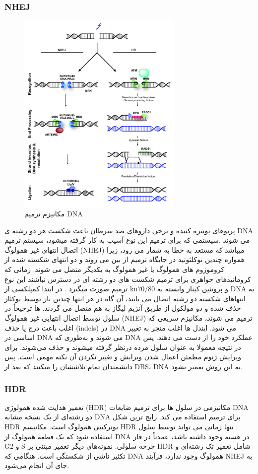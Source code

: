 \documentclass[12pt,a4paper,BCOR=.7cm,headsepline,bibliography=totoc]{report}
\begin{document}
\subsubsection{NHEJ}
\begin{figure}
\centering
\includegraphics[width=8cm, ]{pictures/DBSrepair.jpg}
\caption{
مکانیزم ترمیم DNA
}\label{wrap-fig:4}
\end{figure}
پرتوهای یونیزه کننده و برخی داروهای ضد سرطان باعث شکست هر دو رشته ی DNA می شوند .سیستمی که برای ترمیم این نوع آسیب به کار گرفته میشود، سیستم ترمیم اتصال انتهای غیر همولوگ (NHEJ) میباشد که مستعد به خطا به شمار می رود، زیرا همواره چندین نوکلئوتید در جایگاه ترمیم از بین می روند و دو انتهای شکسته شده از کروموزوم های همولوگ یا غیر همولوگ به یکدیگر متصل می شوند.
زمانی که کروماتیدهای خواهری برای ترمیم شکست های دو رشته ای در دسترس نباشند این نوع ترمیم صورت میگیرد . در ابتدا کمپلکسی از ku70/80 و پروتئین کیناز وابسته به DNA به انتهاهای شکسته دو رشته اتصال می یابند، آن گاه در هر انتها چندین باز توسط نوکئاز حذف شده و دو مولکول از طریق آنزیم لیگاز به هم متصل می گردند. 
ها
 ترجیحاً در سلول توسط اتصال انتهایی غیر همولوگ (NHEJ) ترمیم می شوند، مکانیزم سریعی که اغلب باعث درج یا حذف (indels) در DNA می شود. ایندل ها اغلب منجر به تغییر اساسی در DNA می شوند و به‌طوری که DNA عملکرد خود را از دست می دهند. پس در نتیجه معمولا به عنوان سلول مرده درنظر گرفته میشوند و حذف می‌شوند. برای ویرایش ژنوم مطمئن اعمال شدن ویرایش و تغییر نکردن آن نکته مهمی است. پس دانشمندان تمام تلاششان را میکنند که بعد از DBS، DNA به این روش تعمیر نشود.

\newpage
\subsubsection{HDR}
 تعمیر هدایت شده همولوژی (HDR) مکانیزمی در سلول ها برای ترمیم ضایعات DNA دو رشته‌ای از یک نسخه مشابه DNA برای ترمیم استفاده می کند. رایج ترین شکل HDR نوترکیبی همولوگ است. مکانیسم HDR تنها زمانی می تواند توسط سلول استفاده شود که یک قطعه همولوگ از DNA در هسته وجود داشته باشد، عمدتاً در فاز G2 و S چرخه سلولی. نمونه‌های دیگر تعمیر مبتنی بر HDR شامل تعمیر تک رشته‌ای و تکثیر ناشی از شکستگی است. هنگامی که DNA همولوگ وجود ندارد، فرآیند NHEJ به جای آن انجام می‌شود.
\end{document}
